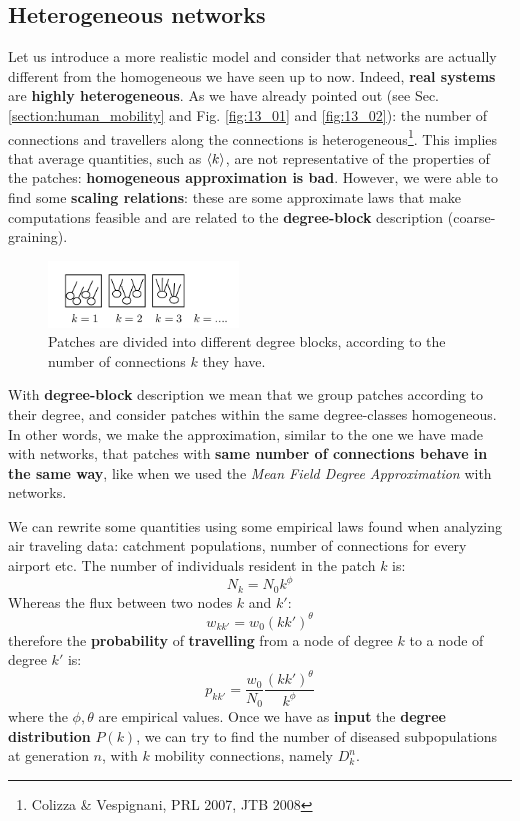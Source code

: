 \documentclass[../main/main.tex]{subfiles}
\begin{document}
\subsection{Heterogeneous networks}

Let us introduce a more realistic model and consider that networks are actually different from the homogeneous we have seen up to now. Indeed, \textbf{real systems} are \textbf{highly heterogeneous}. As we have already pointed out (see Sec. \ref{section:human_mobility} and Fig. \ref{fig:13_01} and \ref{fig:13_02}): the number of connections and travellers along the connections is heterogeneous\footnote{Colizza \& Vespignani, PRL 2007, JTB 2008}. This implies that average quantities, such as $\expval{k}$, are not representative of the properties of the patches: \textbf{homogeneous approximation is bad}.
However, we were able to find some \textbf{scaling relations}: these are some approximate laws that make computations feasible and are related to the \textbf{degree-block} description (coarse-graining).

\begin{figure}[h!]
\centering
\includegraphics[width=0.45\textwidth]{../lessons/image/16/image04.png}
\caption{\label{fig:16_04} Patches are divided into different degree blocks, according to the number of connections $k$ they have.}
\end{figure}

With \textbf{degree-block} description we mean that we group patches according to their degree, and consider patches within the same degree-classes homogeneous. In other words, we make the approximation, similar to the one we have made with networks, that patches with \textbf{same number of connections behave in the same way}, like when we used the \textit{Mean Field Degree Approximation} with networks.

We can rewrite some quantities using some empirical laws found when analyzing air traveling data: catchment populations, number of connections for every airport etc. The number of individuals resident in the patch $k$ is:
\begin{equation*}
    N_k = N_0 k^\phi
\end{equation*}
Whereas the flux between two nodes $k$ and $k'$:
\begin{equation*}
    w_{kk'} = w_0 (k k')^\theta
\end{equation*}
therefore the \textbf{probability} of \textbf{travelling} from a node of degree $k$ to a node of degree $k'$ is:
\begin{equation}
    p_{kk'} = \frac{w_0}{N_0}\frac{(k k')^\theta}{k^\phi}
\end{equation}
where the $\phi, \theta$ are empirical values. Once we have as \textbf{input} the \textbf{degree distribution} $P(k)$, we can try to find the number of diseased subpopulations at generation $n$, with $k$ mobility connections, namely $D_k^n$.
\end{document}
